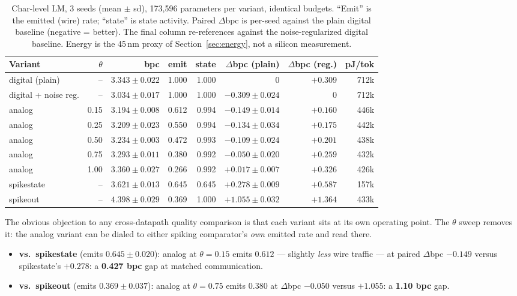 \begin{table}[t]
\centering
\caption{Char-level LM, 3 seeds (mean $\pm$ sd), 173{,}596 parameters per variant, identical
budgets. ``Emit'' is the emitted (wire) rate; ``state'' is state activity. Paired
$\Delta$bpc is per-seed against the plain digital baseline (negative = better). The final
column re-references against the noise-regularized digital baseline. Energy is the 45\,nm
proxy of Section~\ref{sec:energy}, not a silicon measurement.}
\label{tab:charlm}
\footnotesize
\begin{tabular}{l r r r r r r r}
\toprule
Variant & $\theta$ & bpc & emit & state & $\Delta$bpc (plain) & $\Delta$bpc (reg.) & pJ/tok \\
\midrule
digital (plain)        & --   & $3.343 \pm 0.022$ & 1.000 & 1.000 & $0$        & $+0.309$ & 712k \\
digital + noise reg.   & --   & $3.034 \pm 0.017$ & 1.000 & 1.000 & $-0.309 \pm 0.024$ & $0$ & 712k \\
\midrule
analog                 & 0.15 & $3.194 \pm 0.008$ & 0.612 & 0.994 & $-0.149 \pm 0.014$ & $+0.160$ & 446k \\
analog                 & 0.25 & $3.209 \pm 0.023$ & 0.550 & 0.994 & $-0.134 \pm 0.034$ & $+0.175$ & 442k \\
analog                 & 0.50 & $3.234 \pm 0.003$ & 0.472 & 0.993 & $-0.109 \pm 0.024$ & $+0.201$ & 438k \\
analog                 & 0.75 & $3.293 \pm 0.011$ & 0.380 & 0.992 & $-0.050 \pm 0.020$ & $+0.259$ & 432k \\
analog                 & 1.00 & $3.360 \pm 0.027$ & 0.266 & 0.992 & $+0.017 \pm 0.007$ & $+0.326$ & 426k \\
spikestate             & --   & $3.621 \pm 0.013$ & 0.645 & 0.645 & $+0.278 \pm 0.009$ & $+0.587$ & 157k \\
spikeout               & --   & $4.398 \pm 0.029$ & 0.369 & 1.000 & $+1.055 \pm 0.032$ & $+1.364$ & 433k \\
\bottomrule
\end{tabular}
\end{table}

The obvious objection to any cross-datapath quality comparison is that each variant sits at its
own operating point. The $\theta$ sweep removes it: the analog variant can be dialed to either
spiking comparator's \emph{own} emitted rate and read there.

\begin{itemize}
  \item \textbf{vs.\ spikestate} (emits $0.645 \pm 0.020$): analog at $\theta{=}0.15$ emits
    $0.612$ --- slightly \emph{less} wire traffic --- at paired $\Delta$bpc $-0.149$ versus
    spikestate's $+0.278$: a \textbf{0.427 bpc} gap at matched communication.
  \item \textbf{vs.\ spikeout} (emits $0.369 \pm 0.037$): analog at $\theta{=}0.75$ emits
    $0.380$ at $\Delta$bpc $-0.050$ versus $+1.055$: a \textbf{1.10 bpc} gap.
\end{itemize}


